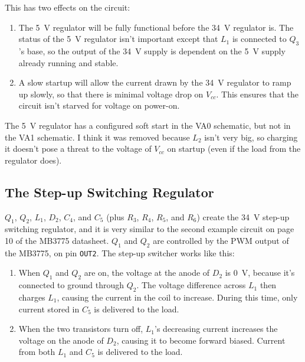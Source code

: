 \documentclass{article}
\newcommand{\Vcc}{$V_{cc}$}
\newcommand{\chippin}{\texttt}
\newcommand{\model}{\textsf}
\begin{document}
This has two effects on the circuit:

\begin{enumerate}
\item The \qty{5}{\volt} regulator will be fully functional before the
  \qty{34}{\volt} regulator is. The status of the \qty{5}{\volt}
  regulator isn't important except that $L_1$ is connected to $Q_3$'s
  base, so the output of the \qty{34}{\volt} supply is dependent on
  the \qty{5}{\volt} supply already running and stable.
\item A slow startup will allow the current drawn by the
  \qty{34}{\volt} regulator to ramp up slowly, so that there is
  minimal voltage drop on \Vcc{}. This ensures that the circuit isn't
  starved for voltage on power-on.
\end{enumerate}

The \qty{5}{\volt} regulator has a configured soft start in the
\model{VA0} schematic, but not in the \model{VA1} schematic. I think
it was removed because $L_2$ isn't very big, so charging it doesn't
pose a threat to the voltage of \Vcc{} on startup (even if the load
from the regulator does).

\subsection{The Step-up Switching Regulator}
\label{sec:step-up_regulator}
$Q_1$, $Q_2$, $L_1$, $D_2$, $C_4$, and $C_5$ (plus $R_3$, $R_4$,
$R_5$, and $R_6$) create the \qty{34}{\volt} step-up switching
regulator, and it is very similar to the second example circuit on
page 10 of the \model{MB3775} datasheet. $Q_1$ and $Q_2$ are
controlled by the PWM output of the \model{MB3775}, on pin
\chippin{OUT2}. The step-up switcher works like this:

\begin{enumerate}
\item When $Q_1$ and $Q_2$ are on, the voltage at the anode of $D_2$
  is \qty{0}{\volt}, because it's connected to ground through
  $Q_2$. The voltage difference across $L_1$ then charges $L_1$,
  causing the current in the coil to increase. During this time, only
  current stored in $C_5$ is delivered to the load.
\item When the two transistors turn off, $L_1$'s decreasing current
  increases the voltage on the anode of $D_2$, causing it to become
  forward biased. Current from both $L_1$ and $C_5$ is delivered to
  the load.
\end{enumerate}
\end{document}
